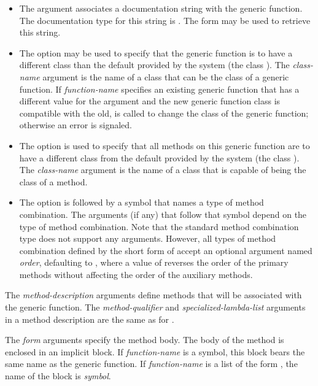 \begin{defmac}
\begin{itemize}
\item  
The  argument associates a documentation string
with the generic function.  The documentation type for this string is
.  The form  may be used to retrieve this
string.

\item  
The  option may be used to specify that
the generic function is to have a different class than the default
provided by the system (the class ).
The \emph{class-name\/} argument is the name of a class that can be the
class of a generic function.  If \emph{function-name\/} specifies
an existing generic function that has a different value for the 
 argument and the new generic function class
is compatible with the old,  is called to change the
class of the generic function; otherwise an error is signaled.

\item  
The  option is used to specify that all methods on
this generic function are to have a different class from the default
provided by the system (the class ).  The {\it
class-name\/} argument is the name of a class that is capable of being
the class of a method.

\item  
The  option is followed by a symbol that
names a type of method combination.  The arguments (if any) that
follow that symbol depend on the type of method combination.  Note
that the standard method combination type does not support any
arguments.  However, all types of method combination defined by the
short form of  accept an optional
argument named \emph{order\/}, defaulting to 
, where a value of  reverses
the order of the primary methods without affecting the order of the
auxiliary methods.

\end{itemize}

The \emph{method-description\/} arguments define methods that will
be associated with the generic function.  The \emph{method-qualifier}
and \emph{specialized-lambda-list} arguments in a method description
are the same as for .

The \emph{form\/} arguments specify the method body.  The body of the
method is enclosed in an implicit block.  If {\it
function-name\/} is a symbol, this block bears the same name as
the generic function.  If \emph{function-name\/} is a list of the
form , the name of the block is {\it
symbol}.  



\end{defmac}
